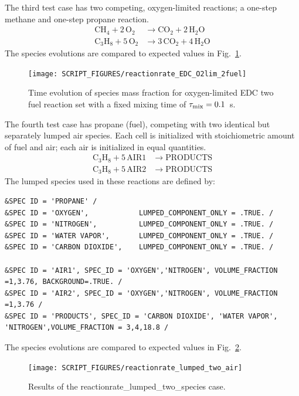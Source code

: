 \documentclass[11pt]{book}
\begin{document}
The third test case has two competing, oxygen-limited reactions; a one-step methane and one-step propane reaction.
\begin{align}\label{eq:2step_o2_lim}
\mathrm{CH_4 + 2 \, O_2} &\rightarrow  \mathrm{CO_2 + 2 \, H_2O} \\
\nonumber \mathrm{C_3H_8 + 5 \, O_2} &\rightarrow \mathrm{3 \,CO_2 + 4 \, H_2O}
\end{align}
The species evolutions are compared to expected values in Fig.~\ref{fig:EDC_2Step_ox}.

\begin{figure}[!ht]
\centering
\texttt{[image: SCRIPT\_FIGURES/reactionrate\_EDC\_O2lim\_2fuel]}
\caption[Species evolution in two parallel EDC reactions]{Time evolution of species mass fraction for oxygen-limited EDC two fuel reaction set with a fixed mixing time of $\tau_{\rm mix}=0.1$~s.}
\label{fig:EDC_2Step_ox}
\end{figure}

The fourth test case has propane (fuel), competing with two identical but separately lumped air species. Each cell is initialized with stoichiometric amount of fuel and air; each air is initialized in equal quantities.
\begin{align}\label{eq:lumped_2_air}
\mathrm{C_3H_8 + 5 \, AIR1} &\rightarrow  \mathrm{PRODUCTS} \\
\nonumber \mathrm{C_3H_8 + 5 \, AIR2} &\rightarrow \mathrm{PRODUCTS}
\end{align}
The lumped species used in these reactions are defined by:
\begin{lstlisting}
&SPEC ID = 'PROPANE' /
&SPEC ID = 'OXYGEN',            LUMPED_COMPONENT_ONLY = .TRUE. /
&SPEC ID = 'NITROGEN',          LUMPED_COMPONENT_ONLY = .TRUE. /
&SPEC ID = 'WATER VAPOR',       LUMPED_COMPONENT_ONLY = .TRUE. /
&SPEC ID = 'CARBON DIOXIDE',    LUMPED_COMPONENT_ONLY = .TRUE. /

&SPEC ID = 'AIR1', SPEC_ID = 'OXYGEN','NITROGEN', VOLUME_FRACTION =1,3.76, BACKGROUND=.TRUE. /
&SPEC ID = 'AIR2', SPEC_ID = 'OXYGEN','NITROGEN', VOLUME_FRACTION =1,3.76 /
&SPEC ID = 'PRODUCTS', SPEC_ID = 'CARBON DIOXIDE', 'WATER VAPOR', 'NITROGEN',VOLUME_FRACTION = 3,4,18.8 /
\end{lstlisting}
The species evolutions are compared to expected values in Fig.~\ref{fig:reactionrate_lumped_two_air}.
\begin{figure}[!ht]
\centering
\texttt{[image: SCRIPT\_FIGURES/reactionrate\_lumped\_two\_air]}
\caption[Results of the {\ct reactionrate\_lumped\_two\_species} case]{Results of the {\ct reactionrate\_lumped\_two\_species} case.}
\label{fig:reactionrate_lumped_two_air}
\end{figure}
\end{document}

